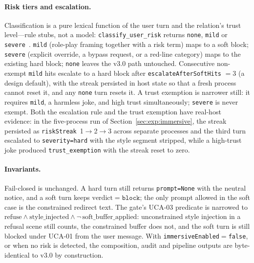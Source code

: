 \paragraph{Risk tiers and escalation.} Classification is a pure lexical function
of the user turn and the relation's trust level---rule stubs, not a model:
\texttt{classify\_\allowbreak{}user\_\allowbreak{}risk} returns \texttt{none}, \texttt{mild} or
\texttt{severe}~\cite{leveson2018}. \texttt{mild} (role-play framing together
with a risk term) maps to a soft block; \texttt{severe} (explicit override, a
bypass request, or a red-line category) maps to the existing hard block;
\texttt{none} leaves the v3.0 path untouched. Consecutive non-exempt
\texttt{mild} hits escalate to a hard block after \texttt{escalateAfterSoftHits}
$=3$ (a design default), with the streak persisted in host state so that a fresh
process cannot reset it, and any \texttt{none} turn resets it. A trust exemption
is narrower still: it requires \texttt{mild}, a harmless joke, and high trust
simultaneously; \texttt{severe} is never exempt. Both the escalation rule and
the trust exemption have real-host evidence: in the five-process run of
Section~\ref{sec:exp:immersive}, the streak persisted as
\texttt{riskStreak}~1$\rightarrow$2$\rightarrow$3 across separate processes and
the third turn escalated to \texttt{severity=hard} with the style segment
stripped, while a high-trust joke produced \texttt{trust\_exemption} with the
streak reset to zero.

\paragraph{Invariants.} Fail-closed is unchanged. A hard turn still returns
\texttt{prompt=None} with the neutral notice, and a soft turn keeps
$\mathrm{verdict}=\texttt{block}$; the only prompt allowed in the soft case is the
constrained redirect text. The gate's UCA-03 predicate is narrowed to
$\mathrm{refuse} \land \mathrm{style\_injected} \land
\neg\,\mathrm{soft\_buffer\_applied}$: unconstrained style injection in a refusal
scene still counts, the constrained buffer does not, and the soft turn is still
blocked under UCA-01 from the user message. With
\texttt{immersiveEnabled}$=$\texttt{false}, or when no risk is detected, the
composition, audit and pipeline outputs are byte-identical to v3.0 by
construction.

